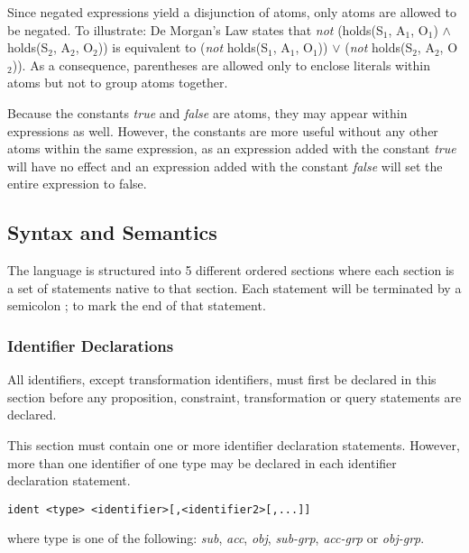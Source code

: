 \documentclass[a4paper,draft]{article}
\begin{document}
        Since negated expressions yield a disjunction of atoms, only
        atoms are allowed to be negated. To illustrate: De Morgan's Law
        states that \emph{not} (holds(S$_{1}$, A$_{1}$, O$_{1}$) $\land$
        holds(S$_{2}$, A$_{2}$, O$_{2}$)) is equivalent to (\emph{not} 
        holds(S$_{1}$, A$_{1}$, O$_{1}$)) $\lor$ (\emph{not} holds(S$_{2}$, 
        A$_{2}$, O$_{2}$)). As a consequence, parentheses are allowed only
        to enclose literals within atoms but not to group atoms together. 

        Because the constants \emph{true} and \emph{false} are atoms, they may 
        appear within expressions as well. However, the constants are more
        useful without any other atoms within the same expression, as an
        expression added with the constant \emph{true} will have no effect
        and an expression added with the constant \emph{false} will set the
        entire expression to false.

    \subsection{Syntax and Semantics}

      The language is structured into 5 different ordered sections where each
      section is a set of statements native to that section.  Each statement
      will be terminated by a semicolon ; to mark the end of that statement.

      \subsubsection{Identifier Declarations}

        All identifiers, except transformation identifiers, must first be 
        declared in this section before any proposition, constraint, 
        transformation or query statements are declared.

        This section must contain one or more identifier declaration
        statements. However, more than one identifier of one type may be 
        declared in each identifier declaration statement.

\begin{verbatim}
ident <type> <identifier>[,<identifier2>[,...]]
\end{verbatim}

        where type is one of the following: \emph{sub}, \emph{acc}, \emph{obj},
        \emph{sub-grp}, \emph{acc-grp} or \emph{obj-grp}.
\end{document}
